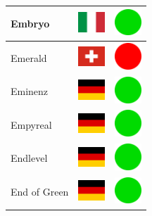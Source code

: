 \documentclass[12pt, a4paper, twoside]{report}
\begin{document}
\begin{center}
\begin{longtable}{|p{5cm}|p{2cm}|p{2cm}|}
Embryo & \includegraphics[width=1cm]{4x3/it} & \includegraphics[width=1cm]{likes/y} \\ \hline
Emerald & \includegraphics[width=1cm]{4x3/ch} & \includegraphics[width=1cm]{likes/n} \\ \hline
Eminenz & \includegraphics[width=1cm]{4x3/de} & \includegraphics[width=1cm]{likes/y} \\ \hline
Empyreal & \includegraphics[width=1cm]{4x3/de} & \includegraphics[width=1cm]{likes/y} \\ \hline
Endlevel & \includegraphics[width=1cm]{4x3/de} & \includegraphics[width=1cm]{likes/y} \\ \hline
End of Green & \includegraphics[width=1cm]{4x3/de} & \includegraphics[width=1cm]{likes/y} \\ \hline

\end{longtable}
\end{center}
\end{document}
